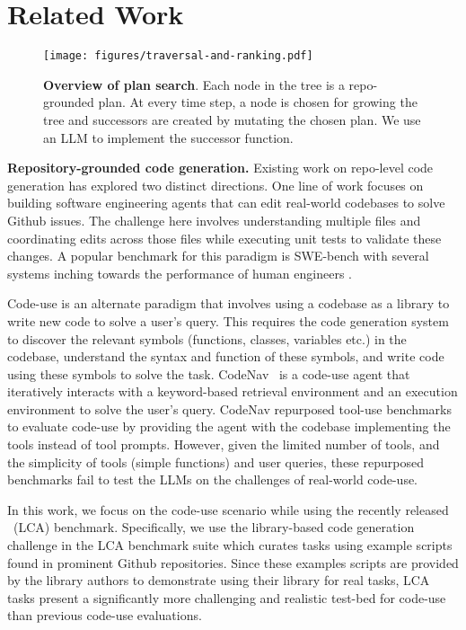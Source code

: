 \section{Related Work}
\begin{figure}
    \centering
    \texttt{[image: figures/traversal-and-ranking.pdf]}
    \vspace{-4mm}
    \caption{\textbf{Overview of plan search}. Each node in the tree is a repo-grounded plan. At every time step, a node is chosen for growing the tree and successors are created by mutating the chosen plan. We use an LLM to implement the successor function.}
    \label{fig:traversal-and-ranking}
\end{figure}
\noindent\textbf{Repository-grounded code generation.} Existing work on repo-level code generation has explored two distinct directions. One line of work focuses on building software engineering agents that can edit real-world codebases to solve Github issues. The challenge here involves understanding multiple files and coordinating edits across those files while executing unit tests to validate these changes. A popular benchmark for this paradigm is SWE-bench \cite{swe_bench} with several systems inching towards the performance of human engineers \cite{swe_agent, agentless}. 

Code-use is an alternate paradigm that involves using a codebase as a library to write new code to solve a user's query. This requires the code generation system to discover the relevant symbols (functions, classes, variables etc.) in the codebase, understand the syntax and function of these symbols, and write code using these symbols to solve the task. CodeNav~\cite{codenav} is a code-use agent that iteratively interacts with a keyword-based retrieval environment and an execution environment to solve the user's query. CodeNav repurposed tool-use benchmarks \cite{m3tooleval,mnms,api_bank} to evaluate code-use by providing the agent with the codebase implementing the tools instead of tool prompts. However, given the limited number of tools, and the simplicity of tools (simple functions) and user queries, these repurposed benchmarks fail to test the LLMs on the challenges of real-world code-use. 

In this work, we focus on the code-use scenario while using the recently released \lca~(LCA) \cite{longcodearena} benchmark. Specifically, we use the library-based code generation challenge in the LCA benchmark suite which curates tasks using example scripts found in prominent Github repositories. Since these examples scripts are provided by the library authors to demonstrate using their library for real tasks, LCA tasks present a significantly more challenging and realistic test-bed for code-use than previous code-use evaluations. 


